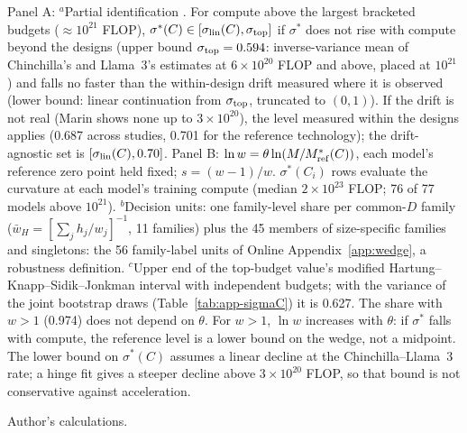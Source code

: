 \begin{table}[tp]
\begin{tablenotes}
Panel A: $^{a}$Partial identification \citep{manski2003partial}. For compute above the largest bracketed budgets ($\approx10^{21}$ FLOP), $\sigma^*(C)\in[\sigma_{\rm lin}(C),\sigma_{\rm top}]$ if $\sigma^*$ does not rise with compute beyond the designs (upper bound $\sigma_{\rm top}=0.594$: inverse-variance mean of Chinchilla's and Llama~3's estimates at $6\times10^{20}$ FLOP and above, placed at $10^{21}$) and falls no faster than the within-design drift measured where it is observed (lower bound: linear continuation from $\sigma_{\rm top}$, truncated to $(0,1)$). If the drift is not real (Marin shows none up to $3\times10^{20}$), the level measured within the designs applies (0.687 across studies, 0.701 for the reference technology); the drift-agnostic set is $[\sigma_{\rm lin}(C),0.70]$. Panel B: $\ln w=\theta\ln(M/M^*_{\rm ref}(C))$, each model's reference zero point held fixed; $s=(w-1)/w$. $\sigma^*(C_i)$ rows evaluate the curvature at each model's training compute (median $2\times10^{23}$ FLOP; 76 of 77 models above $10^{21}$). $^{b}$Decision units: one family-level share per common-$D$ family ($\bar w_H=[\sum_jh_j/w_j]^{-1}$, 11 families) plus the 45 members of size-specific families and singletons: the 56 family-label units of Online Appendix~\ref{app:wedge}, a robustness definition. $^{c}$Upper end of the top-budget value's modified Hartung--Knapp--Sidik--Jonkman interval with independent budgets; with the variance of the joint bootstrap draws (Table~\ref{tab:app-sigmaC}) it is 0.627. The share with $w>1$ (0.974) does not depend on $\theta$. For $w>1$, $\ln w$ increases with $\theta$: if $\sigma^*$ falls with compute, the reference level is a lower bound on the wedge, not a midpoint. The lower bound on $\sigma^*(C)$ assumes a linear decline at the Chinchilla--Llama~3 rate; a hinge fit gives a steeper decline above $3\times10^{20}$ FLOP, so that bound is not conservative against acceleration.
\end{tablenotes}

\begin{tablenotes}[Source]
Author's calculations.
\end{tablenotes}
\end{table}
